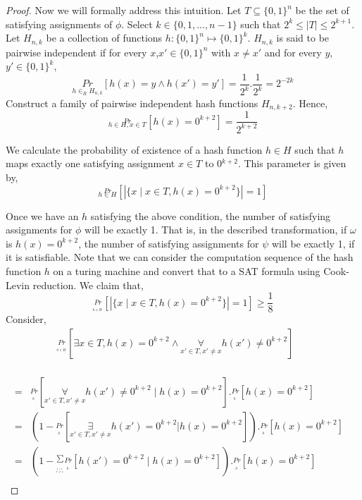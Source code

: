 \begin{proof}
Now we will formally address this intuition.
Let $T \subseteq \{0,1\}^n$ be the set of satisfying assignments of $\phi$. Select $k \in \{0,1,...,n-1\}$ such that $2^k \leq |T| \leq 2^{k+1}$. Let $H_{n,k}$ be a collection of functions $h: \{0,1\}^n \mapsto \{0,1\}^k$. $H_{n,k}$ is said to be pairwise independent if for every $x$,$x' \in \{0,1\}^n$ with $x \neq x'$ and for every $y$,$y' \in \{0, 1\}^k$, 
\[ \underset{h \in_R H_{n,k}}{Pr}[h(x) = y \wedge h(x') =y'] = \frac{1}{2^k}.\frac{1}{2^k}=2^{ -2k}
\]
Construct a family of pairwise independent hash functions $H_{n,k+2}$. Hence, 
\[
\stackrel{Pr}{_{h \in H,x \in T}}[h(x)=0^{k+2}]=\frac{1}{2^{k+2}}
\]

We calculate the probability of existence of a hash function $h \in H$ such that $h$ maps exactly one satisfying assignment $x \in T$ to 0$^{k+2}$. This parameter is given by,
\[
\stackrel{Pr}{_{h \in H}}[|\{x \mid x \in T, h(x)=0^{k+2}\}|=1]
\]

Once we have an $h$ satisfying the above condition, the number of satisfying assignments for $\phi$ will be exactly 1. That is, in the described transformation, if $\omega$ is $h(x)=0^{k+2}$, the number of satisfying assignments for $\psi$ will be exactly 1, if it is satisfiable. Note that we can consider the computation sequence of the hash function $h$ on a turing machine and convert that to a SAT formula using Cook-Levin reduction. We claim that,  
\[
\stackrel{Pr}{_{_{_{h \in H}}}}[|\{x \mid x \in T, h(x)=0^{k+2}\}|=1] \geq \frac{1}{8}
\]
Consider, 
\begin{eqnarray*}
\stackrel{Pr}{_{_{_{h \in H}}}}[\exists x \in T, h(x)=0^{k+2} \wedge \underset{x' \in T,x' \neq x}\forall h(x') \neq 
0^{k+2}] & & \\
\end{eqnarray*}

\begin{eqnarray*}
= & \stackrel{Pr}{_{_{_{h}}}}[\underset{x' \in T,x' \neq x}\forall h(x') \neq 0^{k+2} \mid h(x)=0^{k+2}].\stackrel{Pr}{_{_{_{h}}}}[h(x)=0^{k+2}] & \\
= & (1-\stackrel{Pr}{_{_{_{h}}}}[\underset{x' \in T,x' \neq x}\exists h(x') = 0^{k+2}|h(x)=0^{k+2}]).\stackrel{Pr}{_{_{_{h}}}}[h(x)=0^{k+2}] & \\
= & (1-\stackrel{\sum}{_{_{_{_{\stackrel{x' \in T}{x' \neq x}}}}}}\stackrel{Pr}{_{_{_{h}}}}[h(x')=0^{k+2}\mid h(x)=0^{k+2}]).\stackrel{Pr}{_{_{_{h}}}}[h(x)=0^{k+2}] & \\
\end{eqnarray*}


\end{proof}
